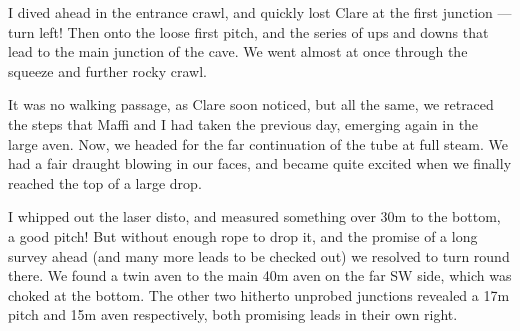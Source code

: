 I dived ahead in the entrance crawl, and quickly lost Clare at the first junction --- turn left! Then onto the loose first pitch, and the series of ups and downs that lead to the main junction of the cave. We went  almost at once through the squeeze and further rocky crawl.

It was no walking passage, as Clare soon noticed, but all the same, we retraced the steps that Maffi and I had taken the previous day, emerging again in the large aven. Now, we headed for the far continuation of the tube at full steam. We had a fair draught blowing in our faces, and became quite excited when we finally reached the top of a large drop. 

I whipped out the laser disto, and measured something over 30m to the bottom, a good pitch! But without enough rope to drop it, and the promise of a long survey ahead (and many more leads to be checked out) we resolved to turn round there. We found a twin aven to the main 40m aven on the far SW side, which was choked at the bottom. The other two hitherto unprobed junctions revealed a 17m pitch and 15m aven respectively, both promising leads in their own right.


